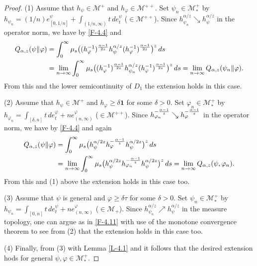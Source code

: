 \documentclass[12pt]{article}
\theoremstyle{definition}
\theoremstyle{remark}
\numberwithin{equation}{section}
\def\Me{\mathcal M}
\def\ffi{\varphi}
\def\1{\mathbf{1}}
\begin{document}
\begin{proof}
(1)\enspace
Assume that $h_\psi\in\Me^+$ and $h_\ffi\in\Me^{++}$. Set $\psi_n\in\Me_*^+$ by
$h_{\psi_n}=(1/n)e_{[0,1/n]}^\psi+\int_{(1/n,\infty)}t\,de_t^\psi$ ($\in\Me^{++}$). Since
$h_{\psi_n}^{\alpha/z}\searrow h_\psi^{\alpha/z}$ in the operator norm, we have by \eqref{F-4.4} and
\cite[Lemma 3.4]{fack1986generalized}
\begin{equation}\label{F-4.11}
\begin{aligned}
Q_{\alpha,z}(\psi\|\ffi)&=\int_0^\infty\mu_s\bigl((h_\ffi^{-1})^{\alpha-1\over2z}h_\psi^{\alpha/z}
(h_\ffi^{-1})^{\alpha-1\over2z}\bigr)^z\,ds \\
&=\lim_{n\to\infty}\int_0^\infty\mu_s\bigl((h_\ffi^{-1})^{\alpha-1\over2z}h_{\psi_n}^{\alpha/z}
(h_\ffi^{-1})^{\alpha-1\over2z}\bigr)^z\,ds
=\lim_{n\to\infty}Q_{\alpha,z}(\psi_n\|\ffi).
\end{aligned}
\end{equation}
From this and the lower semicontinuity of $D_1$ the extension holds in this case.

(2)\enspace
Assume that $h_\psi\in\Me^+$ and $h_\ffi\ge\delta\1$ for some $\delta>0$. Set $\ffi_n\in\Me_*^+$
by $h_{\ffi_n}=\int_{[\delta,n]}t\,de_t^\ffi+ne_{(n,\infty)}^\ffi$ ($\in\Me^{++}$). Since
$h_{\ffi_n}^{-{\alpha-1\over z}}\searrow h_\ffi^{-{\alpha-1\over z}}$ in the operator norm, we have by
\eqref{F-4.4} and \cite[Lemma 3.4]{fack1986generalized} again
\begin{align*}
Q_{\alpha,z}(\psi\|\ffi)&=\int_0^\infty\mu_s\bigl(h_\psi^{\alpha/2z}h_\ffi^{-{\alpha-1\over z}}
h_\psi^{\alpha/2z}\bigr)^z\,ds \\
&=\lim_{n\to\infty}\int_0^\infty\mu_s\bigl(h_\psi^{\alpha/2z}h_{\ffi_n}^{-{\alpha-1\over z}}
h_\psi^{\alpha/2z}\bigr)^z\,ds
=\lim_{n\to\infty}Q_{\alpha,z}(\psi,\ffi_n).
\end{align*}
From this and (1) above the extension holds in this case too.

(3)\enspace
Assume that $\psi$ is general and $\ffi\ge\delta\tau$ for some $\delta>0$. Set $\psi_n\in\Me_*^+$
by $h_{\psi_n}=\int_{[0,n]}t\,de_t^\psi+ne_{(n,\infty)}^\ffi$ ($\in\Me_+$). Since
$h_{\psi_n}^{\alpha/z}\nearrow h_\psi^{\alpha/z}$ in the measure topology, one can argue as in \eqref{F-4.11}
with use of the monotone convergence theorem to see from (2) that the extension holds in this case too.

(4)\enspace
Finally, from (3) with Lemma \ref{L-4.1} and \cite[Corollary 2.8(3)]{hiai2021quantum} it follows that
the desired extension hods for general $\psi,\ffi\in\Me_*^+$.
\end{proof}
\end{document}
